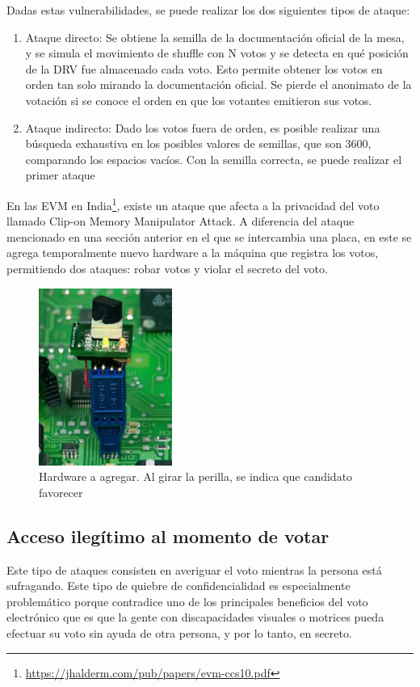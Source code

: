 Dadas estas vulnerabilidades, se puede realizar los dos siguientes tipos de ataque:
\begin{enumerate}
	\item Ataque directo: Se obtiene la semilla de la documentación oficial de la mesa, y se simula el movimiento de shuffle con N votos y se detecta en qué posición de la DRV fue almacenado cada voto. Esto permite obtener los votos en orden tan solo mirando la documentación oficial. Se pierde el anonimato de la votación si se conoce el orden en que los votantes emitieron sus votos.
	\item Ataque indirecto: Dado los votos fuera de orden, es posible realizar una búsqueda exhaustiva en los posibles valores de semillas, que son 3600, comparando los espacios vacíos.  Con la semilla correcta, se puede realizar el primer ataque
\end{enumerate}

En las EVM en India\footnote{\url{https://jhalderm.com/pub/papers/evm-ccs10.pdf}}, existe un ataque que afecta a la privacidad del voto llamado Clip-on Memory Manipulator Attack. A diferencia del ataque mencionado en una sección anterior en el que se intercambia una placa, en este se agrega temporalmente nuevo hardware a la máquina que registra los votos, permitiendo dos ataques: robar votos y violar el secreto del voto.
\begin{figure}[h!]
\includegraphics{Imagenes/privacidad2}
\caption{Hardware a agregar. Al girar la perilla, se indica que candidato favorecer}
\end{figure}


\subsection{Acceso ilegítimo al momento de votar}

Este tipo de ataques consisten en averiguar el voto mientras la persona está sufragando. Este tipo de quiebre de confidencialidad es especialmente problemático porque contradice uno de los principales beneficios del voto electrónico que es que la gente con discapacidades visuales o motrices pueda efectuar su voto sin ayuda de otra persona, y por lo tanto, en secreto.

